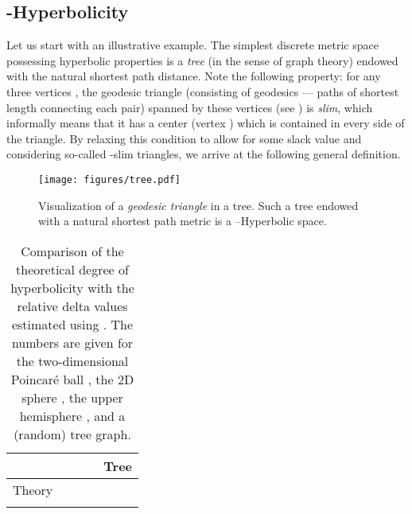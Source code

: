 \documentclass[10pt,twocolumn,letterpaper]{article}
\begin{document}
\subsection{-Hyperbolicity}
Let us start with an illustrative example. The simplest discrete metric space possessing hyperbolic properties is a \emph{tree} (in the sense of graph theory) endowed with the natural shortest path distance. Note the following property: for any three vertices , the geodesic triangle (consisting of geodesics --- paths of shortest length connecting each pair) spanned by these vertices (see ) is \emph{slim}, which informally means that it has a center (vertex ) which is contained in every side of the triangle. By relaxing this condition to allow for some slack value  and considering so-called -slim triangles, we arrive at the following general definition. 
\begin{figure}
    \centering
    \texttt{[image: figures/tree.pdf]}
    \caption{Visualization of a \emph{geodesic triangle} in a tree. Such a tree endowed with a natural shortest path metric is a --Hyperbolic space.}
    \label{fig:tree}
    \vspace{-2mm}
\end{figure}

 \begin{table}[htb!]
\caption{Comparison of the theoretical degree of hyperbolicity with the relative delta  values estimated using . The numbers are given for the two-dimensional Poincar\'e ball , the 2D sphere , the upper hemisphere , and a (random) tree graph. 
}
\setlength{\tabcolsep}{4pt}
\label{tab:deltas_toy}
\vspace{-5mm}
\begin{center}
\begin{tabular}{lcccc}
\toprule
{} &   &   &   &  Tree \\
\midrule
Theory &   &  &     &    \\
  &   &  &     &  \\
\bottomrule
\end{tabular}
\end{center}
\vspace{-5mm}
\end{table}
  
 
\end{document}
